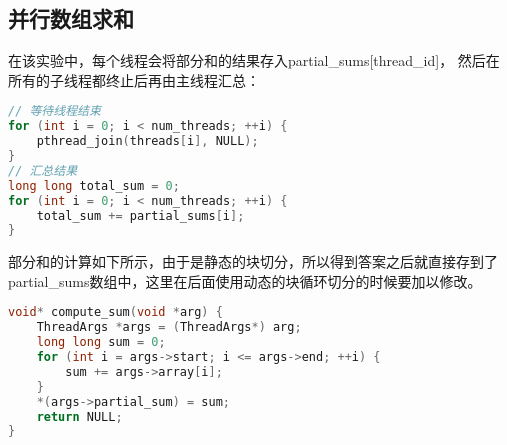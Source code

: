 \documentclass{SYSUReport}
\begin{document}
\subsection{并行数组求和}
在该实验中，每个线程会将部分和的结果存入partial\_sums[thread\_id]，
然后在所有的子线程都终止后再由主线程汇总：
\begin{lstlisting}[language=c]
// 等待线程结束
for (int i = 0; i < num_threads; ++i) {
    pthread_join(threads[i], NULL);
}
// 汇总结果
long long total_sum = 0;
for (int i = 0; i < num_threads; ++i) {
    total_sum += partial_sums[i];
}
\end{lstlisting}
部分和的计算如下所示，由于是静态的块切分，所以得到答案之后就直接存到了
partial\_sums数组中，这里在后面使用动态的块循环切分的时候要加以修改。
\begin{lstlisting}[language=c]
void* compute_sum(void *arg) {
    ThreadArgs *args = (ThreadArgs*) arg;
    long long sum = 0;
    for (int i = args->start; i <= args->end; ++i) {
        sum += args->array[i];
    }
    *(args->partial_sum) = sum;
    return NULL;
}
\end{lstlisting}
\end{document}
